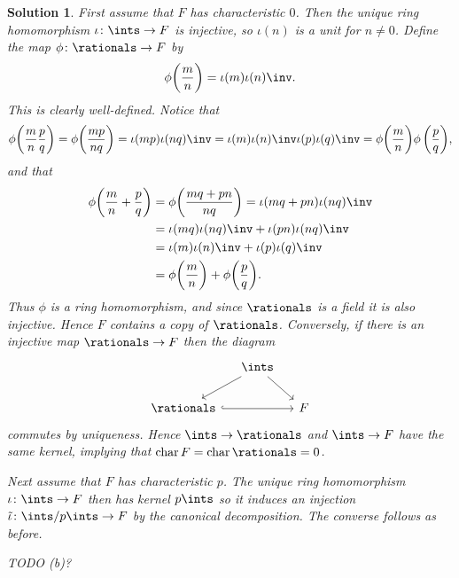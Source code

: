 \documentclass[article, a4paper, 11pt, oneside]{memoir}
\numberwithin{equation}{chapter}
\DeclareMathOperator{\chr}{char}
\theoremstyle{nonumberplain}
\newtheorem{solution}{Solution}
\begin{document}
\begin{solution}
    First assume that $F$ has characteristic $0$. Then the unique ring homomorphism $\iota \colon \ints \to F$ is injective, so $\iota(n)$ is a unit for $n \neq 0$. Define the map $\phi \colon \rationals \to F$ by
    \begin{equation*}
        \phi \biggl( \frac{m}{n} \biggr)
            = \iota(m) \iota(n)\inv.
    \end{equation*}
    This is clearly well-defined. Notice that
    \begin{equation*}
        \phi \biggl( \frac{m}{n} \frac{p}{q} \biggr)
            = \phi \biggl( \frac{mp}{nq} \biggr)
            = \iota(mp) \iota(nq)\inv
            = \iota(m) \iota(n)\inv \iota(p) \iota(q)\inv
            = \phi \biggl( \frac{m}{n} \biggr) \phi \, \biggl( \frac{p}{q} \biggr),
    \end{equation*}
    and that
    \begin{align*}
        \phi \biggl( \frac{m}{n} + \frac{p}{q} \biggr)
            &= \phi \biggl( \frac{mq+pn}{nq} \biggr)
             = \iota(mq+pn) \iota(nq)\inv \\
            &= \iota(mq) \iota(nq)\inv + \iota(pn) \iota(nq)\inv \\
            &= \iota(m) \iota(n)\inv + \iota(p) \iota(q)\inv \\
            &= \phi \biggl( \frac{m}{n} \biggr) + \phi \biggl( \frac{p}{q} \biggr).
    \end{align*}
    Thus $\phi$ is a ring homomorphism, and since $\rationals$ is a field it is also injective. Hence $F$ contains a copy of $\rationals$. Conversely, if there is an injective map $\rationals \to F$ then the diagram
    \begin{equation*}
        \begin{tikzcd}[column sep=small]
            &\ints
                \ar[dl]
                \ar[dr]
            \\
            \rationals
                \ar[rr, hook]
            && F
        \end{tikzcd}
    \end{equation*}
    commutes by uniqueness. Hence $\ints \to \rationals$ and $\ints \to F$ have the same kernel, implying that $\chr F = \chr \rationals = 0$.

    Next assume that $F$ has characteristic $p$. The unique ring homomorphism $\iota \colon \ints \to F$ then has kernel $p\ints$ so it induces an injection $\tilde{\iota} \colon \ints/p\ints \to F$ by the canonical decomposition. The converse follows as before.

    TODO (b)?
\end{solution}
\end{document}
